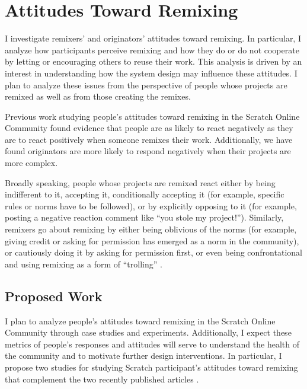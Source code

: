 \section{Attitudes Toward Remixing}

I investigate remixers' and originators' attitudes toward remixing. In particular, I analyze how participants perceive remixing and how they do or do not cooperate by letting or encouraging others to reuse their work.
This analysis is driven by an interest in understanding how the system design may influence these attitudes. 
I plan to analyze these issues from the perspective of people whose projects are remixed as well as from those creating the remixes.
 
Previous work studying people's attitudes toward remixing in the Scratch Online Community \citep{hill_responses_2010, monroy-hernandez_computers_2011} found evidence that people are as likely to react negatively as they are to react positively when someone remixes their work. 
Additionally, we have found originators are more likely to respond negatively when their projects are more complex.

Broadly speaking, people whose projects are remixed react either by being indifferent to it, accepting it, conditionally accepting it (for example, specific rules or norms have to be followed), or by explicitly opposing to it (for example, posting a negative reaction comment like ``you stole my project!'').
Similarly, remixers go about remixing by either being oblivious of the norms (for example, giving credit or asking for permission has emerged as a norm in the  community), or cautiously doing it by asking for permission first, or even being confrontational and using remixing as a form of ``trolling'' \citep{donath_identity_1998}.

\subsection{Proposed Work}

I plan to analyze people's attitudes toward remixing in the Scratch Online Community through case studies and experiments.
Additionally, I expect these metrics of people's responses and attitudes will serve to understand the health of the community and to motivate further design interventions.
In particular, I propose two studies for studying Scratch participant's attitudes toward remixing that complement the two recently published articles \citep{monroy-hernandez_computers_2011,hill_responses_2010}.


